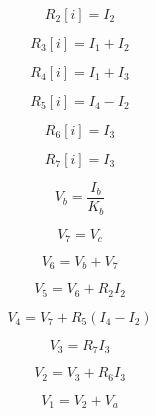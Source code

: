 \begin{equation}
R_2[i] = I_2
  \label{eq: IR2}
\end{equation}

\begin{equation}
R_3[i] = I_1 + I_2
  \label{eq: IR3}
\end{equation}

\begin{equation}
R_4[i] = I_1 + I_3
  \label{eq: IR4}
\end{equation}

\begin{equation}
R_5[i] = I_4 - I_2
  \label{eq: IR5}
\end{equation}

\begin{equation}
R_6[i] = I_3
  \label{eq: IR6}
\end{equation}

\begin{equation}
R_7[i] = I_3
  \label{eq: IR7}
\end{equation}

\begin{equation}
V_b = \frac{I_b}{K_b}
  \label{eq: Vb}
\end{equation}

\begin{equation}
V_7 = V_c
  \label{eq: V7}
\end{equation}

\begin{equation}
V_6 = V_b + V_7
\label{eq: V6}
\end{equation}

\begin{equation}
V_5 = V_6 + R_2I_2
  \label{eq: V5}
\end{equation}

\begin{equation}
V_4 = V_7 + R_5(I_4 - I_2)
  \label{eq: V4}
\end{equation}

\begin{equation}
V_3 = R_7I_3
  \label{eq: V3}
\end{equation}

\begin{equation}
V_2 = V_3 + R_6I_3
  \label{eq: V2}
\end{equation}

\begin{equation}
V_1 = V_2 + V_a
\label{eq: V1}
\end{equation}

